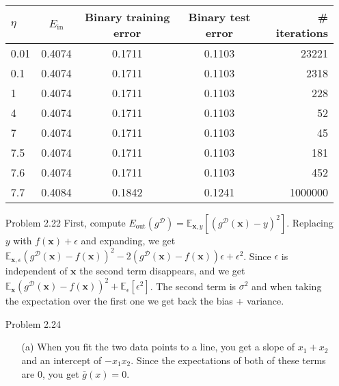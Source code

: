 \documentclass[10pt]{article}
\begin{document}
\begin{enumerate}
  \begin{center}
  \begin{tabular}{l|c|c|c|r}
    $\eta$ & $E_{\text{in}}$ & Binary training error & Binary test error & \# iterations \\
    \hline
    0.01 & 0.4074 & 0.1711 & 0.1103 & 23221 \\
    0.1 & 0.4074 & 0.1711 & 0.1103 & 2318 \\
    1 & 0.4074 & 0.1711 & 0.1103 & 228 \\
    4 & 0.4074 & 0.1711 & 0.1103 & 52 \\
    7 & 0.4074 & 0.1711 & 0.1103 & 45 \\
    7.5 & 0.4074 & 0.1711 & 0.1103 & 181 \\
    7.6 & 0.4074 & 0.1711 & 0.1103 & 452 \\
    7.7 & 0.4084 & 0.1842 & 0.1241 & 1000000 \\
    
  \end{tabular}
  \end{center}

    \item[Problem 2.22] First, compute $E_{\text{out}} (g^{\mathcal{D}}) =
      \mathbb{E}_{\mathbf{x}, y} [ (g^{\mathcal{D}}(\mathbf{x}) - y)^2
      ]$. Replacing $y$ with $f(\mathbf{x}) + \epsilon$ and expanding,
      we get $\mathbb{E}_{\mathbf{x}, \epsilon}
      (g^{\mathcal{D}}(\mathbf{x}) - f(\mathbf{x}))^2 - 2
      (g^{\mathcal{D}}(\mathbf{x}) - f(\mathbf{x})) \epsilon +
      \epsilon^2$. Since $\epsilon$ is independent of $\mathbf{x}$ the
      second term disappears, and we get $\mathbb{E}_{\mathbf{x}}
      (g^{\mathcal{D}}(\mathbf{x}) - f(\mathbf{x}))^2 +
      \mathbb{E}_{\epsilon} [\epsilon^2]$. The second term is
      $\sigma^2$ and when taking the expectation over the first one we
      get back the bias + variance.

    \item[Problem 2.24] 
      \begin{itemize}
        \item[(a)] When you fit the two data points to a line, you get
          a slope of $x_1 + x_2$ and an intercept of $-x_1 x_2$. Since
          the expectations of both of these terms are 0, you get
          $\bar{g} (x) = 0$.


\end{itemize}
\end{enumerate}
\end{document}
